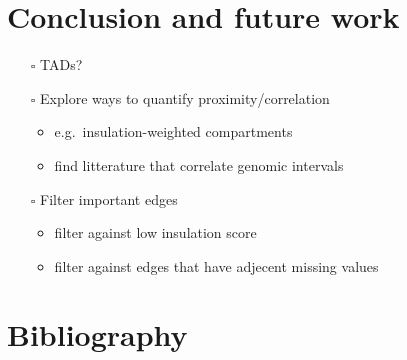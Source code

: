 \documentclass[
  11pt,
  a4paper,
]{scrbook}
\providecommand{\tightlist}{%
  \setlength{\itemsep}{0pt}\setlength{\parskip}{0pt}}\usepackage{longtable,booktabs,array}
\begin{document}
\chapter{Conclusion and future work}\label{conclusion-and-future-work}

\begin{itemize}
\tightlist
\item[$\square$]
  TADs?
\item[$\square$]
  Explore ways to quantify proximity/correlation

  \begin{itemize}
  \tightlist
  \item
    e.g.~insulation-weighted compartments
  \item
    find litterature that correlate genomic intervals
  \end{itemize}
\item[$\square$]
  Filter important edges

  \begin{itemize}
  \tightlist
  \item
    filter against low insulation score
  \item
    filter against edges that have adjecent missing values
  \end{itemize}
\end{itemize}

\chapter*{Bibliography}\label{bibliography}

\begingroup
\raggedright
\end{document}
